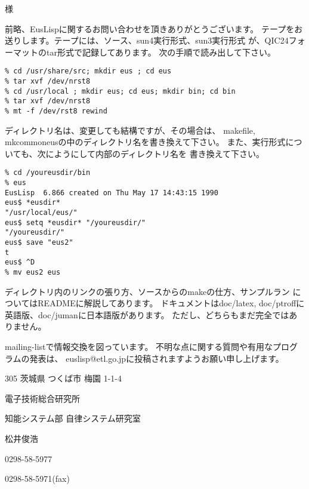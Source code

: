 \pagestyle{plain}
\oddsidemargin=0.5cm
\evensidemargin=0.5cm
\textwidth=16cm
\textheight=24cm


\hspace{80mm}様

\vspace{1cm}

前略、EusLispに関するお問い合わせを頂きありがとうございます。
テープをお送りします。テープには、ソース、sun4実行形式、sun3実行形式
が、QIC24フォーマットのtar形式で記録してあります。
次の手順で読み出して下さい。

\begin{verbatim}
% cd /usr/share/src; mkdir eus ; cd eus
% tar xvf /dev/nrst8 
% cd /usr/local ; mkdir eus; cd eus; mkdir bin; cd bin
% tar xvf /dev/nrst8
% mt -f /dev/rst8 rewind
\end{verbatim}

ディレクトリ名は、変更しても結構ですが、その場合は、
makefile, mkcommoneusの中のディレクトリ名を書き換えて下さい。
また、実行形式についても、次にようにして内部のディレクトリ名を
書き換えて下さい。

\begin{verbatim}
% cd /youreusdir/bin
% eus
EusLisp  6.866 created on Thu May 17 14:43:15 1990
eus$ *eusdir*
"/usr/local/eus/"
eus$ setq *eusdir* "/youreusdir/"
"/youreusdir/"
eus$ save "eus2"
t
eus$ ^D
% mv eus2 eus
\end{verbatim}

ディレクトリ内のリンクの張り方、ソースからのmakeの仕方、サンプルラン
についてはREADMEに解説してあります。
ドキュメントはdoc/latex, doc/ptroffに英語版、doc/jumanに日本語版があります。
ただし、どちらもまだ完全ではありません。

mailing-listで情報交換を図っています。
不明な点に関する質問や有用なプログラムの発表は、
euslisp@etl.go.jpに投稿されますようお願い申し上げます。



\vspace{1cm}

305 茨城県 つくば市 梅園 1-1-4

電子技術総合研究所

知能システム部 自律システム研究室

松井俊浩

0298-58-5977

0298-58-5971(fax)




